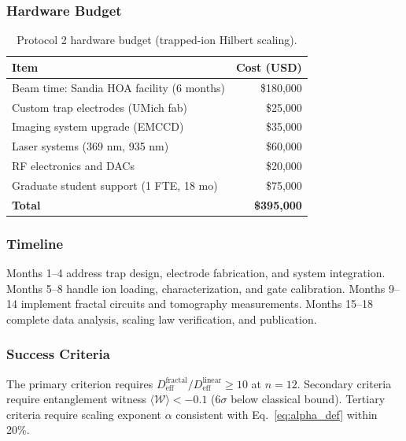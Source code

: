 \subsubsection{Hardware Budget}

\begin{table}[h]
\caption{Protocol 2 hardware budget (trapped-ion Hilbert scaling).}
\label{tab:budget_p2}
\begin{ruledtabular}
\begin{tabular}{lr}
\textbf{Item} & \textbf{Cost (USD)} \\
\hline
Beam time: Sandia HOA facility (6 months) & \$180,000 \\
Custom trap electrodes (UMich fab) & \$25,000 \\
Imaging system upgrade (EMCCD) & \$35,000 \\
Laser systems (369 nm, 935 nm) & \$60,000 \\
RF electronics and DACs & \$20,000 \\
Graduate student support (1 FTE, 18 mo) & \$75,000 \\
\hline
\textbf{Total} & \textbf{\$395,000} \\
\end{tabular}
\end{ruledtabular}
\end{table}

\subsubsection{Timeline}

Months 1--4 address trap design, electrode fabrication, and system integration. Months 5--8 handle ion loading, characterization, and gate calibration. Months 9--14 implement fractal circuits and tomography measurements. Months 15--18 complete data analysis, scaling law verification, and publication.

\subsubsection{Success Criteria}

The primary criterion requires $D_{\mathrm{eff}}^{\mathrm{fractal}} / D_{\mathrm{eff}}^{\mathrm{linear}} \geq 10$ at $n = 12$. Secondary criteria require entanglement witness $\langle \mathcal{W} \rangle < -0.1$ (6$\sigma$ below classical bound). Tertiary criteria require scaling exponent $\alpha$ consistent with Eq.~\eqref{eq:alpha_def} within 20\%.

